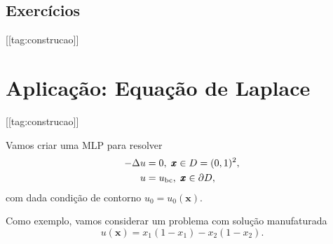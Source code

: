 \subsection{Exercícios}
[[tag:construcao]]

\section{Aplicação: Equação de Laplace}\label{cap_mlp_sec_eqlaplace}
[[tag:construcao]]

Vamos criar uma MLP para resolver
\begin{subequations}\label{cap_mlp_sec_eqlaplace:eq:probLaplace}
  \begin{align}
    -\Delta u &= 0, ~\pmb{x}\in D = (0, 1)^2,\\
    u &= u_{\text{bc}}, ~\pmb{x}\in\partial D,
  \end{align}
\end{subequations}
com dada condição de contorno $u_0 = u_0(\pmb{x})$.

Como exemplo, vamos considerar um problema com solução manufaturada
\begin{equation}
  u(\pmb{x}) = x_1(1-x_1) - x_2(1-x_2).
\end{equation}

